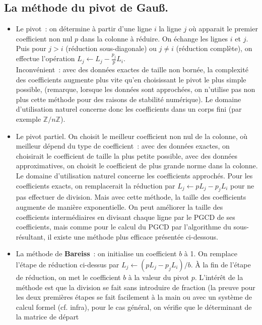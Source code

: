 \documentclass[a4paper,11pt]{book}
\begin{document}
\begin{giacjshere}
\subsection{La m\'ethode du pivot de Gau\ss.} 
\begin{itemize}
\item Le pivot~: on détermine à partir d'une ligne $i$ 
la ligne $j$ où apparait le premier coefficient non nul $p$ dans
la colonne à réduire. On échange les lignes
$i$ et $j$. Puis pour $j>i$ (réduction sous-diagonale)
ou $j\neq i$ (réduction complète), on effectue l'opération
$L_j \leftarrow L_j - \frac{p_j}{p}L_i$.\\
Inconv\'enient~: avec des donn\'ees exactes de taille non born\'ee, 
la complexité des coefficients augmente plus vite qu'en choisissant 
le pivot le plus simple possible, (remarque, lorsque les donn\'ees 
sont approch\'ees, on n'utilise pas non plus cette méthode
pour des raisons de stabilit\'e num\'erique).
Le domaine d'utilisation naturel concerne donc les coefficients
dans un corps fini (par exemple $\mathbb{Z}/n\mathbb{Z}$).
\item Le pivot partiel. On choisit le meilleur coefficient non nul de la
colonne, où meilleur dépend du type de coefficient~: avec des données
exactes, on choisirait le coefficient de taille la plus petite possible,
avec des donn\'ees approximatives, on choisit
le coefficient de plus grande norme dans la colonne.
Le domaine d'utilisation naturel concerne les coefficients
approch\'es. Pour les coefficients exacts, on remplacerait la
réduction par $L_j \leftarrow pL_j -p_j L_i$ pour ne pas effectuer
de division. Mais avec cette méthode, la taille des coefficients
augmente de manière exponentielle. On peut améliorer
la taille des coefficients intermédiaires en divisant chaque
ligne par le PGCD de ses coefficients, mais comme pour le
calcul du PGCD par l'algorithme du sous-résultant, il existe
une méthode plus efficace présentée ci-dessous.
\item La m\'ethode de {\bf Bareiss}~: on initialise un coefficient $b$ \`a 1.
On remplace l'\'etape de r\'eduction ci-dessus
par $L_j \leftarrow (pL_j -p_j L_i)/b$.
\`A la fin de l'\'etape de r\'eduction, on met le coefficient $b$
\`a la valeur du pivot $p$. L'intérêt de la méthode est que la division
se fait sans introduire de fraction (la preuve pour les deux premi\`eres
\'etapes se fait facilement \`a la main ou avec
un système de calcul formel (cf. infra), pour le cas g\'en\'eral, on v\'erifie
que le d\'eterminant de la matrice de d\'epart

\end{itemize}
\end{giacjshere}
\end{document}
